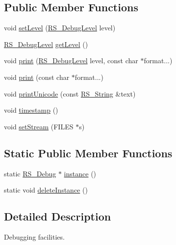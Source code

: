 \subsection*{Public Member Functions}
\begin{DoxyCompactItemize}
\item 
void \hyperlink{class_r_s___debug_a8d5d605324b74d682c9b16762602e298}{set\-Level} (\hyperlink{class_r_s___debug_af13c679a07ad1548ce7624cb9a38d347}{R\-S\-\_\-\-Debug\-Level} level)
\item 
\hyperlink{class_r_s___debug_af13c679a07ad1548ce7624cb9a38d347}{R\-S\-\_\-\-Debug\-Level} \hyperlink{class_r_s___debug_a3fc497803e7a97817c78a0fd91eb800e}{get\-Level} ()
\item 
void \hyperlink{class_r_s___debug_a9d6aedf221a9c547e9014474c2da0642}{print} (\hyperlink{class_r_s___debug_af13c679a07ad1548ce7624cb9a38d347}{R\-S\-\_\-\-Debug\-Level} level, const char $\ast$format...)
\item 
void \hyperlink{class_r_s___debug_ab054d6d7d8788673617d271aeaf188e4}{print} (const char $\ast$format...)
\item 
void \hyperlink{class_r_s___debug_a870a41cd3623ed46997fbb1f30a1659b}{print\-Unicode} (const \hyperlink{rs__string_8h_a5adec11f318c2ae2ecdc6fe2b03be9fa}{R\-S\-\_\-\-String} \&text)
\item 
void \hyperlink{class_r_s___debug_adfcd4dad164fdfa0c9c856d0d8750b51}{timestamp} ()
\item 
void \hyperlink{class_r_s___debug_a4dd8aa7a7fbd3332cf6b81e96be0c2ae}{set\-Stream} (F\-I\-L\-E\-S $\ast$s)
\end{DoxyCompactItemize}
\subsection*{Static Public Member Functions}
\begin{DoxyCompactItemize}
\item 
static \hyperlink{class_r_s___debug}{R\-S\-\_\-\-Debug} $\ast$ \hyperlink{class_r_s___debug_a7d87fe24edcd0a8f84f5568ebb6ba46c}{instance} ()
\item 
static void \hyperlink{class_r_s___debug_a6a2e9a05eb54b126de73aab06c636c24}{delete\-Instance} ()
\end{DoxyCompactItemize}


\subsection{Detailed Description}
Debugging facilities. 

